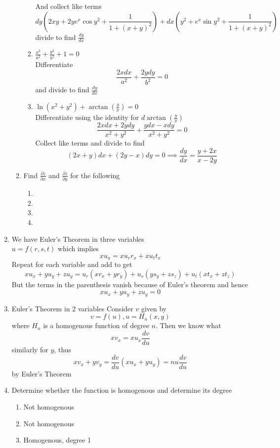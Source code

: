 \documentclass[12pt]{article}
\begin{document}
\begin{enumerate}
\begin{enumerate}
\begin{enumerate}
$$$$
And collect like terms
$$
dy\left( 2xy + 2ye^{ x }\cos y^{2} + \frac{1}{1 + (x+y)^{2}} \right) + dx\left( y^{2} + e^{ x  }\sin y^{2} + \frac{1}{1 + (x + y)^{2}} \right)
$$
divide to find $\frac{dy}{dx}$
\item $\frac{x^{2}}{a^{2}} + \frac{y^{2}}{b^{2}} + 1=0$ \\
Differentiate
$$
\frac{2xdx}{a^{2}} + \frac{2ydy}{b^{2}} = 0
$$
and divide to find $\frac{dy}{dx}$
\item $\ln(x^{2} + y^{2}) + \arctan\left( \frac{y}{x} \right) =0$ \\
Differentiate using the identity for $d \arctan\left( \frac{y}{x} \right)$
$$
\frac{2xdx + 2ydy}{x^{2} + y^{2}} + \frac{ydx-xdy}{x^{2} + y^{2}} = 0
$$
Collect like terms and divide to find
$$
(2x + y)dx + (2y-x)dy = 0 \implies \frac{dy}{dx} = \frac{y + 2x}{x-2y}
$$
\end{enumerate}
\item Find $\frac{ \partial z }{ \partial x }$ and $\frac{ \partial z }{ \partial y }$ for the following
\begin{enumerate}
\item 
\item
\item
\item
\end{enumerate}
\end{enumerate}
\item We have Euler's Theorem in three variables
\\ $u = f(r,s,t)$ which implies
$$
xu_{x} = xu_{r}r_{x} + xu_{t}t_{x} 
$$
Repeat for each variable and add to get
$$
xu_{x } + yu_{y} + zu_{y} =u_{r}(xr_{x} + yr_{y} ) + u_{s} (ys_{y} + zs_{z}) + u_{t}(xt_{x} + zt_{z})
$$
But the terms in the parenthesis vanish because of Euler's theorem and hence 
$$
xu_{x} + yu_{y} + zu_{y} = 0
$$
\item Euler's Theorem in 2 variables
Consider $v$ given by
$$
v = f(u), u = H_{n}(x,y)
$$
where $H_{n}$ is a homogenous function of degree $n$. Then we know what
$$
xv_{x} = xu_{x} \frac{dv}{du}
$$
similarly for $y$, thus
$$
\boxed{
xv_{x} + yv_{y} = \frac{dv}{du}(xu_{x} + yu_{y}) =nu \frac{ dv}{du}
}
$$
by Euler's Theorem
\item Determine whether the function is homogenous and determine its degree
\begin{enumerate}
\item Not homogenous
\item Not homogenous
\item Homogenous, degree 1

\end{enumerate}
\end{enumerate}
\end{document}
